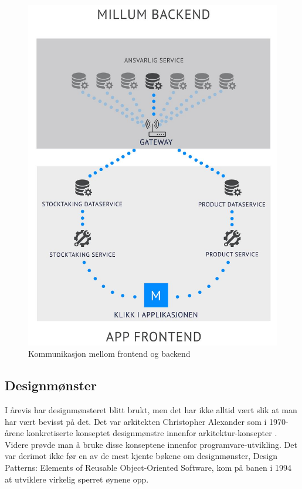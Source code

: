 \begin{figure}[H] 
    \centering
    \includegraphics[width=\textwidth]{figures/Tekniske-valg/Arkitektur/kommunikasjon.JPG}
    \caption{Kommunikasjon mellom frontend og backend}
\end{figure}

\subsection{\textbf{Designmønster}}

I årevis har designmønsteret blitt brukt, men det har ikke alltid vært slik at man har vært bevisst på det. Det var arkitekten Christopher Alexander som i 1970-årene konkretiserte konseptet designmønstre innenfor arkitektur-konsepter \cite{christopheralexander}. Videre prøvde man å bruke disse konseptene innenfor programvare-utvikling. Det var derimot ikke før en av de mest kjente bøkene om designmønster,   
Design Patterns: Elements of Reusable Object-Oriented Software, kom på banen i 1994 at utviklere virkelig sperret øynene opp. 


